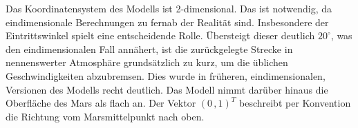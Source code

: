 Das Koordinatensystem des Modells ist 2-dimensional. Das ist notwendig, da eindimensionale Berechnungen zu fernab der Realität sind. Insbesondere der Eintrittswinkel spielt eine entscheidende Rolle. Übersteigt dieser deutlich $20^{\circ}$, was den eindimensionalen Fall annähert, ist die zurückgelegte Strecke in nennenswerter Atmosphäre grundsätzlich zu kurz, um die üblichen Geschwindigkeiten abzubremsen. Dies wurde in früheren, eindimensionalen, Versionen des Modells recht deutlich.
Das Modell nimmt darüber hinaus die Oberfläche des Mars als flach an. Der Vektor $(0 \,, 1)^T$ beschreibt per Konvention die Richtung vom Marsmittelpunkt nach oben.